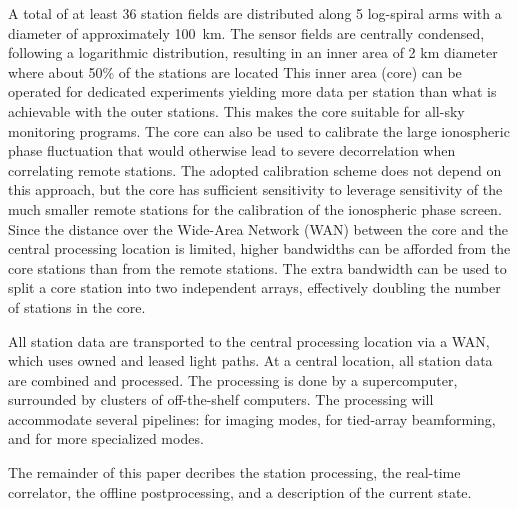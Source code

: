 \documentclass[journal]{IEEEtran}
\begin{document}
A total of at least 36 station fields are distributed along 5 log-spiral arms with a diameter of approximately 100~km. The sensor fields are centrally condensed, following a logarithmic distribution, resulting in an inner area of 2 km diameter where about 50\% of the stations are located This inner area (core) can be operated for dedicated experiments yielding more data per station than what is achievable with the outer stations. This makes the core suitable for all-sky monitoring programs. The core can also be used to calibrate the large ionospheric phase fluctuation that would otherwise lead to severe decorrelation when correlating remote stations. The adopted calibration scheme does not depend on this approach, but the core has sufficient sensitivity to leverage sensitivity of the much smaller remote stations for the calibration of the ionospheric phase screen.  
Since the distance over the Wide-Area Network (WAN) between the core and the
central processing location is limited, higher bandwidths can be afforded from
the core stations than from the remote stations.
The extra bandwidth can be used to split a core station into two independent
arrays, effectively doubling the number of stations in the core.

All station data are transported to the central processing location via a
WAN, which uses owned and leased light paths.
At a central location, all station data are combined and processed.
The processing is done by a supercomputer, surrounded by clusters of
off-the-shelf computers.
The processing will accommodate several pipelines: for imaging modes,
for tied-array beamforming, and for more specialized modes.

The remainder of this paper decribes the station processing,
the real-time correlator, the offline postprocessing, and a description
of the current state.

 



\end{document}
